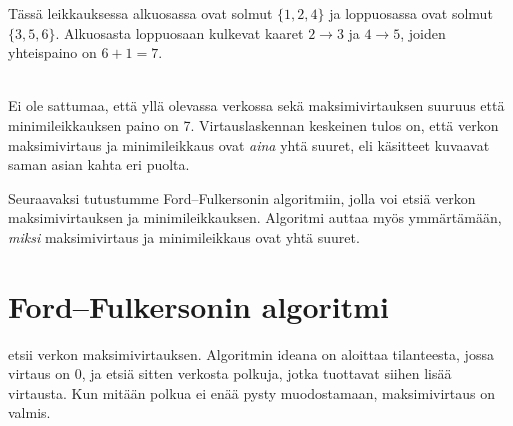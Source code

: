 \begin{center}
\end{center}

Tässä leikkauksessa alkuosassa ovat solmut $\{1,2,4\}$
ja loppuosassa ovat solmut $\{3,5,6\}$.
Alkuosasta loppuosaan kulkevat
kaaret $2 \rightarrow 3$ ja $4 \rightarrow 5$,
joiden yhteispaino on $6+1=7$.

~\\
\noindent
Ei ole sattumaa, että yllä olevassa verkossa
sekä maksimivirtauksen suuruus
että minimileikkauksen paino on 7.
Virtauslaskennan keskeinen tulos on,
että verkon maksimivirtaus ja
minimileikkaus
ovat \textit{aina} yhtä suuret,
eli käsitteet kuvaavat saman asian
kahta eri puolta.

Seuraavaksi tutustumme Ford–Fulkersonin
algoritmiin, jolla voi etsiä verkon
maksimivirtauksen ja
minimileikkauksen.
Algoritmi auttaa myös ymmärtämään,
\textit{miksi} maksimivirtaus ja
minimileikkaus ovat yhtä suuret.

\section{Ford–Fulkersonin algoritmi}


 etsii verkon maksimivirtauksen.
Algoritmin ideana on aloittaa tilanteesta,
jossa virtaus on 0, ja etsiä sitten verkosta polkuja,
jotka tuottavat siihen lisää virtausta.
Kun mitään polkua ei enää pysty muodostamaan,
maksimivirtaus on valmis.

